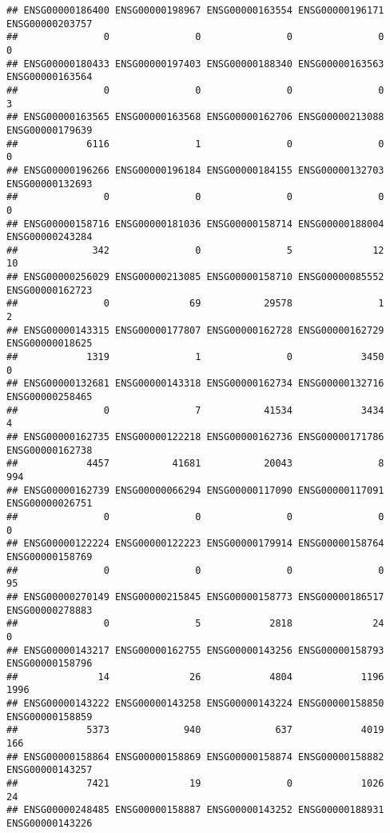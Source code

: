 \documentclass[
]{article}
\begin{document}
\begin{verbatim}
## ENSG00000186400 ENSG00000198967 ENSG00000163554 ENSG00000196171 ENSG00000203757 
##               0               0               0               0               0 
## ENSG00000180433 ENSG00000197403 ENSG00000188340 ENSG00000163563 ENSG00000163564 
##               0               0               0               0               3 
## ENSG00000163565 ENSG00000163568 ENSG00000162706 ENSG00000213088 ENSG00000179639 
##            6116               1               0               0               0 
## ENSG00000196266 ENSG00000196184 ENSG00000184155 ENSG00000132703 ENSG00000132693 
##               0               0               0               0               0 
## ENSG00000158716 ENSG00000181036 ENSG00000158714 ENSG00000188004 ENSG00000243284 
##             342               0               5              12              10 
## ENSG00000256029 ENSG00000213085 ENSG00000158710 ENSG00000085552 ENSG00000162723 
##               0              69           29578               1               2 
## ENSG00000143315 ENSG00000177807 ENSG00000162728 ENSG00000162729 ENSG00000018625 
##            1319               1               0            3450               0 
## ENSG00000132681 ENSG00000143318 ENSG00000162734 ENSG00000132716 ENSG00000258465 
##               0               7           41534            3434               4 
## ENSG00000162735 ENSG00000122218 ENSG00000162736 ENSG00000171786 ENSG00000162738 
##            4457           41681           20043               8             994 
## ENSG00000162739 ENSG00000066294 ENSG00000117090 ENSG00000117091 ENSG00000026751 
##               0               0               0               0               0 
## ENSG00000122224 ENSG00000122223 ENSG00000179914 ENSG00000158764 ENSG00000158769 
##               0               0               0               0              95 
## ENSG00000270149 ENSG00000215845 ENSG00000158773 ENSG00000186517 ENSG00000278883 
##               0               5            2818              24               0 
## ENSG00000143217 ENSG00000162755 ENSG00000143256 ENSG00000158793 ENSG00000158796 
##              14              26            4804            1196            1996 
## ENSG00000143222 ENSG00000143258 ENSG00000143224 ENSG00000158850 ENSG00000158859 
##            5373             940             637            4019             166 
## ENSG00000158864 ENSG00000158869 ENSG00000158874 ENSG00000158882 ENSG00000143257 
##            7421              19               0            1026              24 
## ENSG00000248485 ENSG00000158887 ENSG00000143252 ENSG00000188931 ENSG00000143226 

\end{verbatim}
\end{document}
